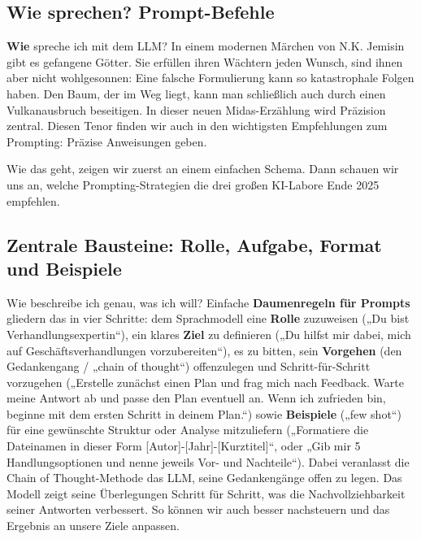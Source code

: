 \documentclass[
  ngerman,
  letterpaper,
  DIV=11]{scrreprt}
\begin{document}
\subsection{Wie sprechen? Prompt-Befehle}\label{sec-how-to-speak}

\textbf{Wie} spreche ich mit dem LLM? In einem modernen Märchen von N.K.
Jemisin gibt es gefangene Götter. Sie erfüllen ihren Wächtern jeden
Wunsch, sind ihnen aber nicht wohlgesonnen: Eine falsche Formulierung
kann so katastrophale Folgen haben. Den Baum, der im Weg liegt, kann man
schließlich auch durch einen Vulkanausbruch beseitigen. In dieser neuen
Midas-Erzählung wird Präzision zentral. Diesen Tenor finden wir auch in
den wichtigsten Empfehlungen zum Prompting: Präzise Anweisungen geben.

Wie das geht, zeigen wir zuerst an einem einfachen Schema. Dann schauen
wir uns an, welche Prompting-Strategien die drei großen KI-Labore Ende
2025 empfehlen.

\subsection{Zentrale Bausteine: Rolle, Aufgabe, Format und
Beispiele}\label{sec-prompt-components}

Wie beschreibe ich genau, was ich will? Einfache \textbf{Daumenregeln
für Prompts} gliedern das in vier Schritte: dem Sprachmodell eine
\textbf{Rolle} zuzuweisen („Du bist Verhandlungsexpertin``), ein klares
\textbf{Ziel} zu definieren („Du hilfst mir dabei, mich auf
Geschäftsverhandlungen vorzubereiten``), es zu bitten, sein
\textbf{Vorgehen} (den Gedankengang / „chain of thought``) offenzulegen
und Schritt-für-Schritt vorzugehen („Erstelle zunächst einen Plan und
frag mich nach Feedback. Warte meine Antwort ab und passe den Plan
eventuell an. Wenn ich zufrieden bin, beginne mit dem ersten Schritt in
deinem Plan.``) sowie \textbf{Beispiele} („few shot``) für eine
gewünschte Struktur oder Analyse mitzuliefern („Formatiere die
Dateinamen in dieser Form {[}Autor{]}-{[}Jahr{]}-{[}Kurztitel{]}``, oder
„Gib mir 5 Handlungsoptionen und nenne jeweils Vor- und Nachteile``).
Dabei veranlasst die Chain of Thought-Methode das LLM, seine
Gedankengänge offen zu legen. Das Modell zeigt seine Überlegungen
Schritt für Schritt, was die Nachvollziehbarkeit seiner Antworten
verbessert. So können wir auch besser nachsteuern und das Ergebnis an
unsere Ziele anpassen.
\end{document}
